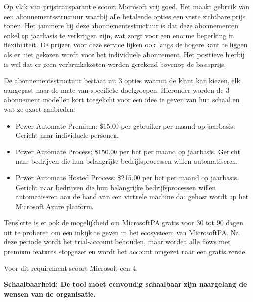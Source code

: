 \vspace{\baselineskip}

Op vlak van prijstransparantie scoort Microsoft vrij goed. Het maakt gebruik van een abonnementsstructuur waarbij alle betalende opties een vaste zichtbare prijs tonen. Het jammere bij deze abonnementsstructuur is dat deze abonnementen enkel op jaarbasis te verkrijgen zijn, wat zorgt voor een enorme beperking in flexibiliteit.  De prijzen voor deze service lijken ook langs de hogere kant te liggen als er niet gekozen wordt voor het individuele abonnement. Het positieve hierbij is wel dat er geen verbruikskosten worden gerekend bovenop de basisprijs.

\vspace{\baselineskip}

De abonnementsstructuur bestaat uit 3 opties waaruit de klant kan kiezen, elk aangepast naar de mate van specifieke doelgroepen. Hieronder worden de 3 abonnement modellen kort toegelicht voor een idee te geven van hun schaal en wat ze exact aanbieden:

\begin{itemize}
    \item Power Automate Premium: \$15.00 per gebruiker per maand op jaarbasis. Gericht naar individuele personen.
    \item Power Automate Process: \$150.00 per bot per maand op jaarbasis. Gericht naar bedrijven die hun belangrijke bedrijfsprocessen willen automatiseren.
    \item Power Automate Hosted Process: \$215.00 per bot per maand op jaarbasis. Gericht naar bedrijven die hun belangrijke bedrijfsprocessen willen automatiseren aan de hand van een virtuele machine dat gehost wordt op het Microsoft Azure platform.
\end{itemize}

Tenslotte is er ook de mogelijkheid om MicrosoftPA gratis voor 30 tot 90 dagen uit te proberen om een inkijk te geven in het ecosysteem van MicrosoftPA. Na deze periode wordt het trial-account behouden, maar worden alle flows met premium features stopgezet en wordt het account omgezet naar een gratis versie.

Voor dit requirement scoort Microsoft een 4.

\vspace{\baselineskip}

\textbf{Schaalbaarheid: De tool moet eenvoudig schaalbaar zijn naargelang de wensen van de organisatie.}

\vspace{\baselineskip}


